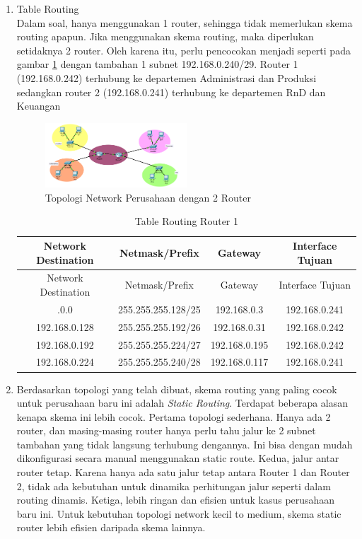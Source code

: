 \begin{enumerate}
	\item Table Routing\\
	Dalam soal, hanya menggunakan 1 router, sehingga tidak memerlukan skema routing apapun. Jika menggunakan skema routing, maka diperlukan setidaknya 2 router. Oleh karena itu, perlu pencocokan menjadi seperti pada gambar \ref{fig:Topologi Network Perusahaan dengan 2 Router} dengan tambahan 1 subnet 192.168.0.240/29. Router 1 (192.168.0.242) terhubung ke departemen Administrasi dan Produksi sedangkan router 2 (192.168.0.241) terhubung ke departemen RnD dan Keuangan
	\begin{figure}[!h] 
    \centering
    \includegraphics[width=0.5\textwidth]{P1/img/tupen3.png}
    \caption{Topologi Network Perusahaan dengan 2 Router}
    \label{fig:Topologi Network Perusahaan dengan 2 Router}
	\end{figure}
	\begin{longtable}{|c|c|c|c|}
		\caption{Table Routing Router 1}
		\label{tab:tupen4} \\
		\hline
		Network Destination & Netmask/Prefix & Gateway & Interface Tujuan \\
		\hline
		\endfirsthead
		\hline
		Network Destination & Netmask/Prefix & Gateway & Interface Tujuan \\
		\hline
		\endhead
		\hline
		\endfoot
		\hline
		\endlastfoot
		192.168.0.0 & 255.255.255.128/25 & 192.168.0.3 & 192.168.0.241 \\ \hline
		192.168.0.128 & 255.255.255.192/26 & 192.168.0.31 & 192.168.0.242 \\ \hline
		192.168.0.192 & 255.255.255.224/27 & 192.168.0.195 & 192.168.0.242 \\ \hline
		192.168.0.224 & 255.255.255.240/28 & 192.168.0.117 & 192.168.0.241 \\ \hline
		\end{longtable}
	\item Berdasarkan topologi yang telah dibuat, skema routing yang paling cocok untuk perusahaan baru ini adalah \emph{Static Routing}. Terdapat beberapa alasan kenapa skema ini lebih cocok. Pertama topologi sederhana. Hanya ada 2 router, dan masing-masing router hanya perlu tahu jalur ke 2 subnet tambahan yang tidak langsung terhubung dengannya. Ini bisa dengan mudah dikonfigurasi secara manual menggunakan static route. Kedua, jalur antar router tetap. Karena hanya ada satu jalur tetap antara Router 1 dan Router 2, tidak ada kebutuhan untuk dinamika perhitungan jalur seperti dalam routing dinamis. Ketiga, lebih ringan dan efisien untuk kasus perusahaan baru ini. Untuk kebutuhan topologi network kecil to medium, skema static router lebih efisien daripada skema lainnya.
\end{enumerate}